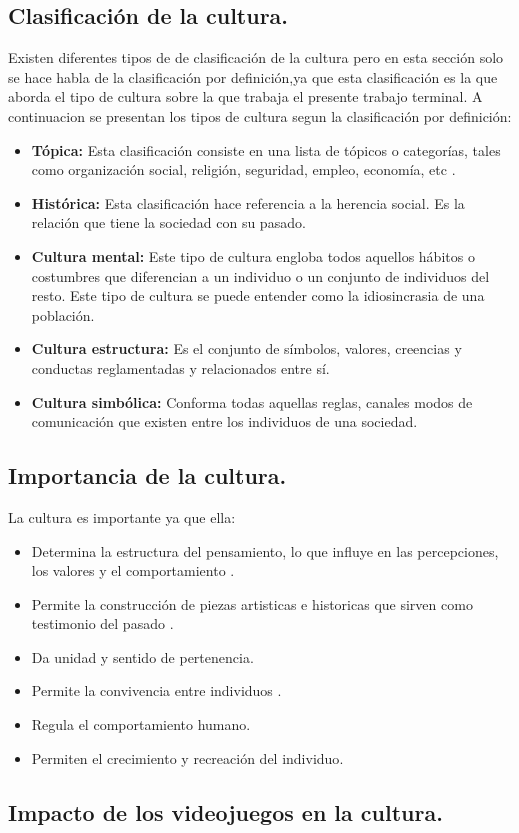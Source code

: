 	\subsection{Clasificación de la cultura.}\label{CulturaClasi}
	Existen diferentes tipos de de clasificación de la cultura pero en esta sección solo se hace habla de la clasificación por definición,ya que esta clasificación es la que aborda el tipo de cultura sobre la que trabaja el presente trabajo terminal. A continuacion se presentan los tipos de cultura segun la clasificación por definición:
	\begin{itemize}
		\item \textbf{Tópica:} Esta clasificación consiste en una lista de tópicos o categorías, tales como organización social, religión, seguridad, empleo, economía, etc \cite{RefculturaClasificacion}.
		\item \textbf{Histórica:} Esta clasificación hace referencia a la herencia social. Es la relación que tiene la sociedad con su pasado\cite{RefculturaClasificacionEl}. 
		\item \textbf{Cultura mental:} Este tipo de cultura engloba todos aquellos hábitos o costumbres que diferencian a un individuo o un conjunto de individuos del resto. Este tipo de cultura se puede entender como la idiosincrasia de una población\cite{RefculturaClasificacion}.
		\item \textbf{Cultura estructura:} Es el conjunto de símbolos, valores, creencias y conductas reglamentadas y relacionados entre sí\cite{RefculturaClasificacionEl}. 
		\item \textbf{Cultura simbólica:} Conforma todas aquellas reglas, canales  modos de comunicación que existen entre los individuos de una sociedad\cite{RefculturaClasificacion}.

	\end{itemize}
	\subsection{Importancia de la cultura.}\label{CulturaImpo}
	La cultura es importante ya que ella:
	\begin{itemize}
		\item Determina la estructura del pensamiento, lo que influye en las percepciones, los valores y el comportamiento \cite{RefImporCul}.
		\item Permite la construcción de piezas artisticas e historicas que sirven como testimonio del pasado \cite{RefImpoCulAr}.		
		\item Da unidad y sentido de pertenencia\cite{RefImpoUnidad}.
		\item Permite la convivencia entre individuos \cite{RefImporCul}.
		\item Regula el comportamiento humano\cite{RefImporCul}.
		\item Permiten el crecimiento y recreación del individuo\cite{RefImpoCulAr}.
	\end{itemize}
	 
	\subsection{Impacto de los videojuegos en la cultura.}\label{CulturaImpacto}
